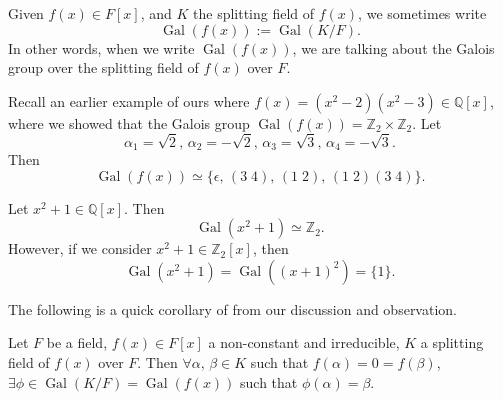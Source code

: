 \documentclass[notoc,notitlepage,nobib]{tufte-book}
\DeclareMathOperator{\Gal}{Gal}
\begin{document}
\begin{notation}
  Given $f(x) \in F[x]$, and $K$ the splitting field of $f(x)$, we sometimes
  write
  \begin{equation*}
    \Gal(f(x)) := \Gal(K / F).
  \end{equation*}
  In other words, when we write $\Gal(f(x))$, we are talking about the Galois
  group over the splitting field of $f(x)$ over $F$.
\end{notation}

\begin{eg}
  Recall an earlier example of ours where $f(x) = (x^2 - 2)(x^2 - 3) \in
  \mathbb{Q}[x]$, where we showed that the Galois group $\Gal(f(x)) =
  \mathbb{Z}_2 \times \mathbb{Z}_2$. Let
  \begin{equation*}
    \alpha_1 = \sqrt{2}, \, \alpha_2 = - \sqrt{2}, \, \alpha_3 = \sqrt{3}, \,
    \alpha_4 = - \sqrt{3}.
  \end{equation*}
  Then
  \begin{equation*}
    \Gal(f(x)) \simeq \{ \epsilon, \, (3 \; 4), \, (1 \; 2), \, (1 \; 2)(3 \; 4)
    \}.
  \end{equation*}
\end{eg}

\begin{eg}
  Let $x^2 + 1 \in \mathbb{Q}[x]$. Then 
  \begin{equation*}
    \Gal(x^2 + 1) \simeq \mathbb{Z}_2.
  \end{equation*}
  However, if we consider $x^2 + 1 \in \mathbb{Z}_2[x]$, then
  \begin{equation*}
    \Gal(x^2 + 1) = \Gal((x + 1)^2) = \{ 1 \}.
  \end{equation*}
\end{eg}

The following is a quick corollary of from our discussion and observation.

\begin{crly}\label{crly:the_galois_group_completely_captures_all_permutation_of_the_roots}
  Let $F$ be a field, $f(x) \in F[x]$ a non-constant and irreducible, $K$ a
  splitting field of $f(x)$ over $F$. Then $\forall \alpha, \, \beta \in K$ such
  that $f(\alpha) = 0 = f(\beta)$, $\exists \phi \in \Gal(K / F) = \Gal(f(x))$
  such that $\phi(\alpha) = \beta$.
\end{crly}
\end{document}

